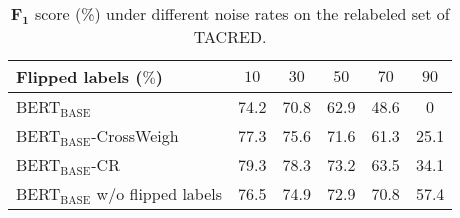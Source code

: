 \documentclass[11pt]{article}
\begin{document}
\begin{table}[t]
    \centering
    \caption{$\bm{F_1}$ score (\%) of alternative noise filtering strategies on the test set of TACRED. The best results are achieved when $\delta=2\%$ for both methods.}
    \label{tab:ablation}
\end{table}

\begin{table}[t]
    \centering
    \caption{$\bm{F_1}$ score (\%) of different functions for $\bm{q}$ on the relabeled test set of TACRED.}
    \label{tab:other_functions}
\end{table}

\begin{table}[t]
    \centering
{\small
    \setlength{\tabcolsep}{3pt}
    \begin{tabular}{lccccc}
    \toprule
     \textbf{Flipped labels ($\%$)} & $10$& $30$& $50$& $70$& $90$ \\
     \midrule
     BERT$_\text{BASE}$& 74.2& 70.8& 62.9& 48.6& 0\\
     BERT$_\text{BASE}$-CrossWeigh& 77.3& 75.6& 71.6& 61.3& 25.1\\
     BERT$_\text{BASE}$-CR& 79.3& 78.3&
     73.2& 63.5& 34.1\\
     \midrule
     BERT$_\text{BASE}$ w/o flipped labels& 76.5& 74.9& 72.9& 70.8& 57.4\\
    \bottomrule
    \end{tabular}
    }
    \caption{$\bm{F_1}$ score (\%) under different noise rates on the relabeled set of TACRED.}
    \label{tab:noise_rates}
\end{table}
\end{document}
